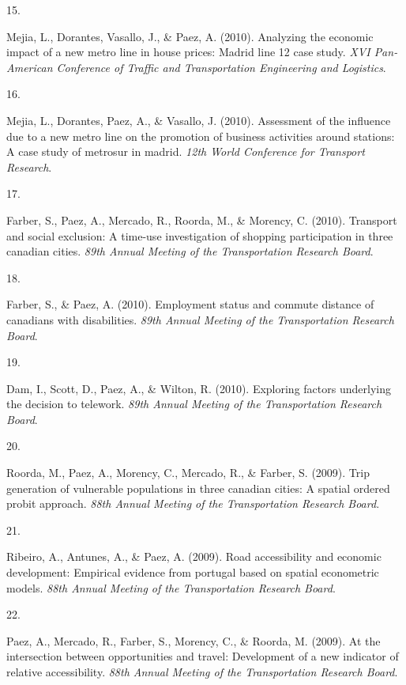 \documentclass[10pt,a4paper,]{twentysecondcv}
\newlength{\csllabelwidth}
\newcommand{\CSLLeftMargin}[1]{\parbox[t]{\csllabelwidth}{#1}}
\newcommand{\CSLRightInline}[1]{\parbox[t]{\linewidth - \csllabelwidth}{#1}}
\begin{document}
\leavevmode{}%
\CSLLeftMargin{15. }%
\CSLRightInline{Mejia, L., Dorantes, Vasallo, J., \& Paez, A. (2010).
Analyzing the economic impact of a new metro line in house prices:
Madrid line 12 case study. \emph{XVI Pan-American Conference of Traffic
and Transportation Engineering and Logistics}.}

\leavevmode{}%
\CSLLeftMargin{16. }%
\CSLRightInline{Mejia, L., Dorantes, Paez, A., \& Vasallo, J. (2010).
Assessment of the influence due to a new metro line on the promotion of
business activities around stations: A case study of metrosur in madrid.
\emph{12th World Conference for Transport Research}.}

\leavevmode{}%
\CSLLeftMargin{17. }%
\CSLRightInline{Farber, S., Paez, A., Mercado, R., Roorda, M., \&
Morency, C. (2010). Transport and social exclusion: A time-use
investigation of shopping participation in three canadian cities.
\emph{89th Annual Meeting of the Transportation Research Board}.}

\leavevmode{}%
\CSLLeftMargin{18. }%
\CSLRightInline{Farber, S., \& Paez, A. (2010). Employment status and
commute distance of canadians with disabilities. \emph{89th Annual
Meeting of the Transportation Research Board}.}

\leavevmode{}%
\CSLLeftMargin{19. }%
\CSLRightInline{Dam, I., Scott, D., Paez, A., \& Wilton, R. (2010).
Exploring factors underlying the decision to telework. \emph{89th Annual
Meeting of the Transportation Research Board}.}

\leavevmode{}%
\CSLLeftMargin{20. }%
\CSLRightInline{Roorda, M., Paez, A., Morency, C., Mercado, R., \&
Farber, S. (2009). Trip generation of vulnerable populations in three
canadian cities: A spatial ordered probit approach. \emph{88th Annual
Meeting of the Transportation Research Board}.}

\leavevmode{}%
\CSLLeftMargin{21. }%
\CSLRightInline{Ribeiro, A., Antunes, A., \& Paez, A. (2009). Road
accessibility and economic development: Empirical evidence from portugal
based on spatial econometric models. \emph{88th Annual Meeting of the
Transportation Research Board}.}

\leavevmode{}%
\CSLLeftMargin{22. }%
\CSLRightInline{Paez, A., Mercado, R., Farber, S., Morency, C., \&
Roorda, M. (2009). At the intersection between opportunities and travel:
Development of a new indicator of relative accessibility. \emph{88th
Annual Meeting of the Transportation Research Board}.}
\end{document}
